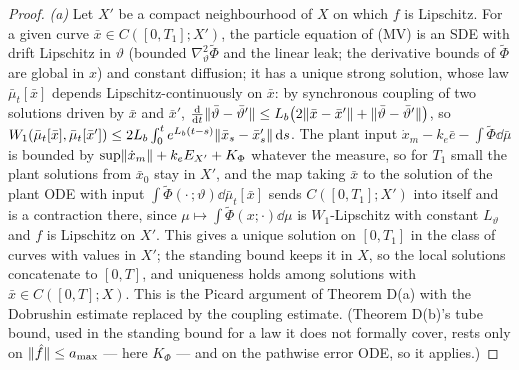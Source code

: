 \begin{proof}
\textit{(a)} Let $X'$ be a compact neighbourhood of $X$ on which $f$ is Lipschitz. For a given curve
$\bar x\in C([0,T_1];X')$, the particle equation of \textup{(MV)} is an SDE with drift Lipschitz in $\vartheta$
(bounded $\nabla^2_\vartheta\tilde\Phi$ and the linear leak; the derivative bounds of $\tilde\Phi$ are global in $x$)
and constant diffusion; it has a unique strong solution, whose law $\bar\mu_t[\bar x]$ depends
Lipschitz-continuously on $\bar x$: by synchronous coupling of two solutions driven by $\bar x$ and $\bar x'$,
$\frac{\mathrm{d}}{\mathrm{d}t}\lVert \bar\vartheta - \bar\vartheta'\rVert
\le L_b\bigl(2\lVert \bar x - \bar x'\rVert + \lVert \bar\vartheta - \bar\vartheta'\rVert\bigr)$, so
$W_1(\bar\mu_t[\bar x],\bar\mu_t[\bar x']) \le 2L_b\int_0^te^{L_b(t-s)}\lVert \bar x_s - \bar x'_s\rVert\,\mathrm{d} s$. The plant
input $\dot x_m - k_e\bar e - \int\tilde\Phi\dd\bar\mu$ is bounded by $\sup\lVert \dot x_m\rVert + k_eE_{X'} + K_\Phi$
whatever the measure, so for $T_1$ small the plant solutions from $\bar x_0$ stay in $X'$, and the map taking $\bar x$
to the solution of the plant ODE with input $\int\tilde\Phi(\cdot\,;\vartheta)\dd\bar\mu_t[\bar x]$ sends
$C([0,T_1];X')$ into itself and is a contraction there, since $\mu\mapsto\int\tilde\Phi(x;\cdot)\dd\mu$ is
$W_1$-Lipschitz with constant $L_\vartheta$ and $f$ is Lipschitz on $X'$. This gives a unique solution on $[0,T_1]$ in
the class of curves with values in $X'$; the standing bound keeps it in $X$, so the local solutions concatenate to
$[0,T]$, and uniqueness holds among solutions with $\bar x\in C([0,T];X)$. This is the Picard argument of
Theorem D(a) with the Dobrushin estimate replaced by the coupling estimate. (Theorem D(b)'s tube bound, used in the
standing bound for a law it does not formally cover, rests only on $\lVert \hat f\rVert\le a_{\max}$ --- here $K_\Phi$ ---
and on the pathwise error ODE, so it applies.)


\end{proof}
